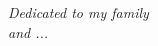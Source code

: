 \newpage\null\thispagestyle{empty}\newpage
\thispagestyle{empty}
\begin{flushright}
\null{}
{\em Dedicated to my family} \\
{\em and ...}
\null
\end{flushright}